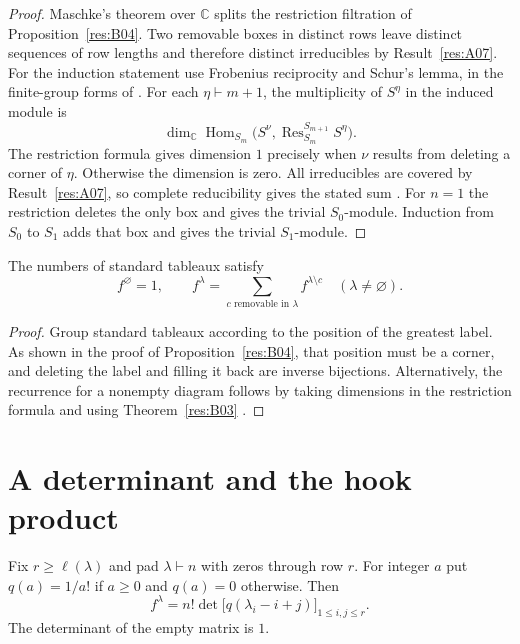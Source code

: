 \begin{proof}
Maschke's theorem over \(\mathbb C\) splits the restriction filtration
of Proposition~\ref{res:B04}. Two removable boxes in distinct rows
leave distinct sequences of row lengths and therefore distinct
irreducibles by Result~\ref{res:A07}. For the induction statement
use Frobenius reciprocity and Schur's lemma, in the finite-group
forms of \cite[Chapters 8--9]{algebra-core}. For each
\(\eta\vdash m+1\), the multiplicity of \(S^\eta\) in the induced
module is
\[
  \dim_{\mathbb C}\operatorname{Hom}_{S_m}
      \bigl(S^\nu,\operatorname{Res}^{S_{m+1}}_{S_m}S^\eta\bigr).
\]
The restriction formula gives dimension \(1\) precisely when
\(\nu\) results from deleting a corner of \(\eta\). Otherwise the
dimension is zero. All irreducibles are covered by
Result~\ref{res:A07}, so complete reducibility gives the stated sum
\cite[Theorem 2.8.3]{sagan}. For \(n=1\) the restriction deletes the
only box and gives the trivial \(S_0\)-module. Induction from \(S_0\)
to \(S_1\) adds that box and gives the trivial \(S_1\)-module.
\end{proof}

\begin{corollary}\label{res:B06}
The numbers of standard tableaux satisfy
\[
   f^{\varnothing}=1,\qquad
   f^\lambda=\sum_{c\text{ removable in }\lambda}f^{\lambda\setminus c}
   \quad(\lambda\ne\varnothing).
\]
\end{corollary}

\begin{proof}
Group standard tableaux according to the position of the greatest
label. As shown in the proof of Proposition~\ref{res:B04}, that
position must be a corner, and deleting the label and filling it
back are inverse bijections. Alternatively, the recurrence for a
nonempty diagram follows by taking dimensions in the restriction
formula and using Theorem~\ref{res:B03}
\cite[Lemma 2.8.2 and Theorem 2.8.3]{sagan}.
\end{proof}

\section{A determinant and the hook product}

\begin{theorem}\label{res:B07}
Fix \(r\ge \ell(\lambda)\) and pad \(\lambda\vdash n\) with zeros
through row \(r\). For integer \(a\) put \(q(a)=1/a!\) if
\(a\ge 0\) and \(q(a)=0\) otherwise. Then
\[
  f^\lambda=n!\det\bigl[q(\lambda_i-i+j)\bigr]_{1\le i,j\le r}.
\]
The determinant of the empty matrix is \(1\).
\end{theorem}

